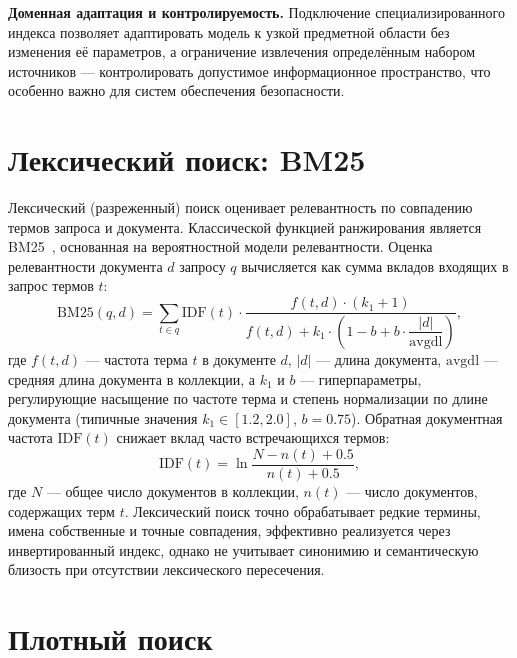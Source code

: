 \textbf{Доменная адаптация и контролируемость.} Подключение специализированного индекса позволяет адаптировать модель к узкой предметной области без изменения её параметров, а ограничение извлечения определённым набором источников --- контролировать допустимое информационное пространство, что особенно важно для систем обеспечения безопасности.

\section{Лексический поиск: BM25}\label{sec:rag_bm25}

Лексический (разреженный) поиск оценивает релевантность по совпадению термов запроса и документа.
Классической функцией ранжирования является BM25~\cite{robertson2009bm25}, основанная на вероятностной модели релевантности.
Оценка релевантности документа $d$ запросу $q$ вычисляется как сумма вкладов входящих в запрос термов $t$:
\begin{equation}
\label{eq:bm25}
    \mathrm{BM25}(q, d) = \sum_{t \in q} \mathrm{IDF}(t) \cdot \frac{f(t, d) \cdot (k_1 + 1)}{f(t, d) + k_1 \cdot \left(1 - b + b \cdot \dfrac{|d|}{\mathrm{avgdl}}\right)},
\end{equation}
где $f(t, d)$ --- частота терма $t$ в документе $d$, $|d|$ --- длина документа, $\mathrm{avgdl}$ --- средняя длина документа в коллекции, а $k_1$ и $b$ --- гиперпараметры, регулирующие насыщение по частоте терма и степень нормализации по длине документа (типичные значения $k_1 \in [1.2, 2.0]$, $b = 0.75$).
Обратная документная частота $\mathrm{IDF}(t)$ снижает вклад часто встречающихся термов:
\begin{equation}
\label{eq:bm25_idf}
    \mathrm{IDF}(t) = \ln\frac{N - n(t) + 0.5}{n(t) + 0.5},
\end{equation}
где $N$ --- общее число документов в коллекции, $n(t)$ --- число документов, содержащих терм $t$.
Лексический поиск точно обрабатывает редкие термины, имена собственные и точные совпадения, эффективно реализуется через инвертированный индекс, однако не учитывает синонимию и семантическую близость при отсутствии лексического пересечения.

\section{Плотный поиск}\label{sec:rag_dense}

